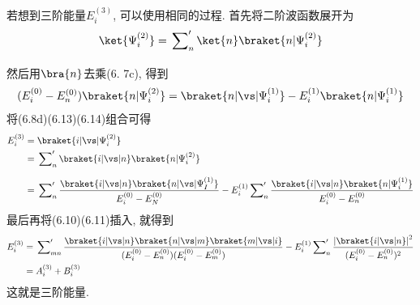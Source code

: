若想到三阶能量$E_i^{(3)}$, 
可以使用相同的过程. 
首先将二阶波函数展开为
\begin{align}
\ket{\Psi_i^{(2)}} = \sideset{}{'}{\sum_n}\ket{n}\braket{n|\Psi_i^{(2)}}
\end{align}
然后用$\bra{n}$去乘(6.
7c), 
得到
\begin{align}
(E_i^{(0)} -E_n^{(0)} )\braket{n|\Psi_i^{(2)}} = \braket{n|\vs|\Psi_i^{(1)}} - E_i^{(1)}\braket{n|\Psi_i^{(1)}}
\end{align}
将(6.8d)(6.13)(6.14)组合可得
\begin{align*}
E_i^{(3)} & = \braket{i|\vs|\Psi_i^{(2)}}\\
		  & = \sideset{}{'}{\sum_n}\braket{i|\vs|n}\braket{n|\Psi_i^{(2)}}\\
		  & =\sideset{}{'}{\sum_n}\frac{\braket{i|\vs|n}\braket{n|\vs|\Psi_I^{(1)}}}{E_i^{(0)} - E_N^{(0)}} - E_i^{(1)} \sideset{}{'}{\sum_n}\frac{\braket{i|\vs|n}\braket{n|\Psi_i^{(1)}}}{E_i^{(0)} - E_n^{(0)} }
\end{align*}
最后再将(6.10)(6.11)插入, 
就得到
\begin{align}
E_i^{(3)} & =\sideset{}{'}{\sum_{mn}}\frac{\braket{i|\vs|n}\braket{n|\vs|m}\braket{m|\vs|i} }{(E_i^{(0)} -E_n^{(0)})(E_i^{(0)} - E_m^{(0)} )  } - E_i^{(1)} \sideset{}{'}{\sum_n} \frac{\left| \braket{i|\vs|n} \right|^2}{(E_i^{(0)} -E_n^{(0)} )^2}\notag\\
& = A_i^{(3)} + B_i^{(3)}
\label{6.15}
\end{align}
这就是三阶能量.



